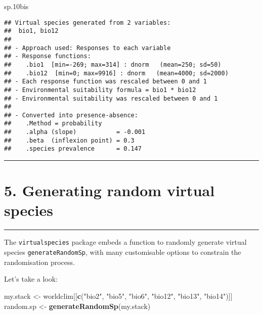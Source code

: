 \documentclass[]{article}
\newenvironment{Shaded}{\begin{snugshade}}{\end{snugshade}}
\newcommand{\KeywordTok}[1]{\textcolor[rgb]{0.13,0.29,0.53}{\textbf{#1}}}
\newcommand{\StringTok}[1]{\textcolor[rgb]{0.31,0.60,0.02}{#1}}
\newcommand{\NormalTok}[1]{#1}
\begin{document}
\begin{Shaded}
\begin{Highlighting}[]
\NormalTok{sp.10bis}
\end{Highlighting}
\end{Shaded}

\begin{verbatim}
## Virtual species generated from 2 variables:
##  bio1, bio12
## 
## - Approach used: Responses to each variable
## - Response functions:
##    .bio1  [min=-269; max=314] : dnorm   (mean=250; sd=50)
##    .bio12  [min=0; max=9916] : dnorm   (mean=4000; sd=2000)
## - Each response function was rescaled between 0 and 1
## - Environmental suitability formula = bio1 * bio12
## - Environmental suitability was rescaled between 0 and 1
## 
## - Converted into presence-absence:
##    .Method = probability
##    .alpha (slope)           = -0.001
##    .beta  (inflexion point) = 0.3
##    .species prevalence      = 0.147
\end{verbatim}

\begin{center}\rule{0.5\linewidth}{\linethickness}\end{center}

\section{5. Generating random virtual
species}\label{generating-random-virtual-species}

\begin{center}\rule{0.5\linewidth}{\linethickness}\end{center}

\setcounter{section}{5} \setcounter{figure}{0}

The \texttt{virtualspecies} package embeds a function to randomly
generate virtual species \texttt{generateRandomSp}, with many
customisable options to constrain the randomisation process.

Let's take a look:

\begin{Shaded}
\begin{Highlighting}[]
\NormalTok{my.stack <-}\StringTok{ }\NormalTok{worldclim[[}\KeywordTok{c}\NormalTok{(}\StringTok{"bio2"}\NormalTok{, }\StringTok{"bio5"}\NormalTok{, }\StringTok{"bio6"}\NormalTok{, }\StringTok{"bio12"}\NormalTok{, }\StringTok{"bio13"}\NormalTok{, }\StringTok{"bio14"}\NormalTok{)]]}
\NormalTok{random.sp <-}\StringTok{ }\KeywordTok{generateRandomSp}\NormalTok{(my.stack)}
\end{Highlighting}
\end{Shaded}
\end{document}

